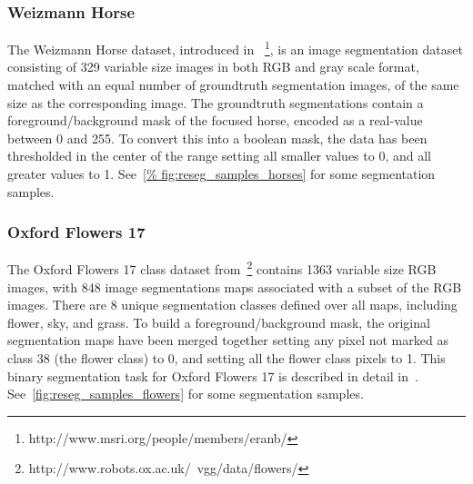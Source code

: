 \subsubsection{Weizmann Horse}
The Weizmann Horse dataset, introduced in~\cite{Borenstein04combiningtop-down}
\footnote{http://www.msri.org/people/members/eranb/},
is an image segmentation dataset consisting of 329 variable size images in both
RGB and gray scale format, matched with an equal number of groundtruth
segmentation images, of the same size as the corresponding image. The
groundtruth segmentations contain a foreground/background mask of the focused
horse, encoded as a real-value between 0 and 255. To convert this into a
boolean mask, the data has been thresholded in the center of the range setting
all smaller values to 0, and all greater values to 1. See~\autoref{%
fig:reseg_samples_horses} for some segmentation samples.


\subsubsection{Oxford Flowers 17}
The Oxford Flowers 17 class dataset from~\cite{Nilsback06}\footnote{%
http://www.robots.ox.ac.uk/~vgg/data/flowers/} contains 1363
variable size RGB images, with 848 image segmentations maps associated with
a subset of the RGB images. There are 8 unique segmentation classes defined
over all maps, including flower, sky, and grass. To build a
foreground/background mask, the original segmentation maps have been merged
together setting any pixel not marked as class 38 (the flower class) to 0, and
setting all the flower class pixels to 1. This binary segmentation task for
Oxford Flowers 17 is described in detail in~\cite{Xiaomeng14}.
See~\autoref{fig:reseg_samples_flowers} for some segmentation samples.

